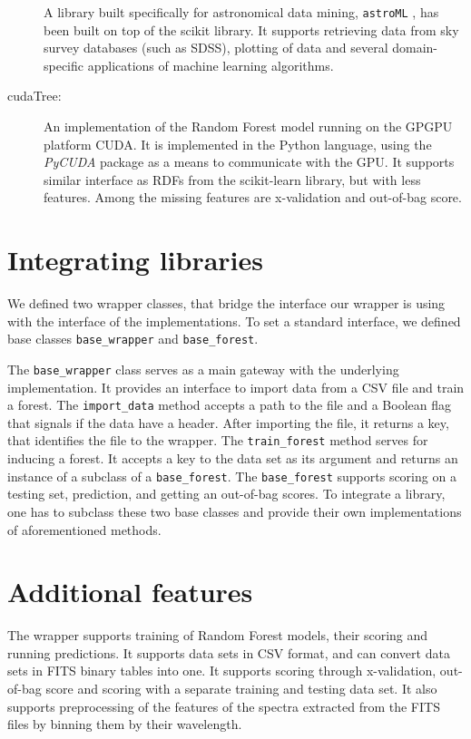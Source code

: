 \documentclass[thesis=B,english]{FITthesis}[2012/10/20]
\begin{document}
\begin{description}
A library built specifically for astronomical data mining, \texttt{astroML} \cite{astroml}, has been built on top of the scikit library. It supports retrieving data from sky survey databases (such as SDSS), plotting of data and several domain-specific applications of machine learning algorithms.
\item [cudaTree:] An implementation of the Random Forest model running on the GPGPU platform CUDA. It is implemented in the Python language, using the \textit{PyCUDA} package as a means to communicate with the GPU. It supports similar interface as RDFs from the scikit-learn library, but with less features. Among the missing features are x-validation and out-of-bag score.
\end{description}

\section{Integrating libraries}
We defined two wrapper classes, that bridge the interface our wrapper is using with the interface of the implementations. To set a standard interface, we defined base classes \texttt{base\_wrapper} and \texttt{base\_forest}. 

The \texttt{base\_wrapper} class serves as a main gateway with the underlying implementation. It provides an interface to import data from a CSV file and train a forest. The \texttt{import\_data} method accepts a path to the file and a Boolean flag that signals if the data have a header. After importing the file, it returns a key, that identifies the file to the wrapper. The \texttt{train\_forest} method serves for inducing a forest. It accepts a key to the data set as its argument and returns an instance of a subclass of a \texttt{base\_forest}. The \texttt{base\_forest} supports scoring on a testing set, prediction, and getting an out-of-bag scores. To integrate a library, one has to subclass these two base classes and provide their own implementations of aforementioned methods.

\section{Additional features}
The wrapper supports training of Random Forest models, their scoring and running predictions. It supports data sets in CSV format, and can convert data sets in FITS binary tables into one. It supports scoring through x-validation, out-of-bag score and scoring with a separate training and testing data set. It also supports preprocessing of the features of the spectra extracted from the FITS files by binning them by their wavelength.
\end{document}

